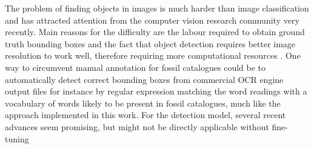 \documentclass{article}
\begin{document}
The problem of finding objects in images is much harder than image classification and has attracted attention 
from the computer vision research community very recently. 
Main reasons for the difficulty are the labour required to obtain ground truth bounding boxes and 
the fact that object detection requires better image resolution to work well, therefore requiring more computational resources \cite{ruotsalainen2024}.
One way to circumvent manual annotation for fossil catalogues could be to automatically detect correct bounding boxes 
from commercial OCR engine output files for instance by regular expression matching the word readings with a vocabulary of words likely to be 
present in fossil catalogues, much like the approach implemented in this work.
For the detection model, several recent advances seem promising, but might not be directly applicable without fine-tuning 
\end{document}
